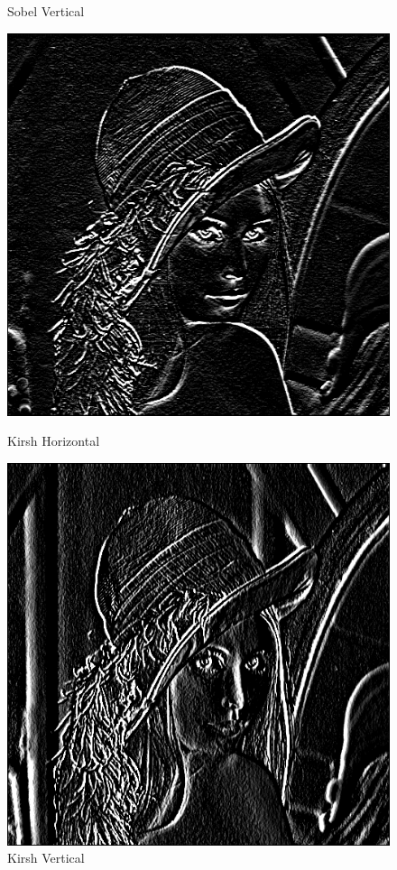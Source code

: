 \documentclass[11pt]{article}
\begin{document}
\begin{figure}[H]
\begin{minipage}[c]{.46\linewidth}
			\caption{Sobel Vertical}
			\label{fig:SobelVertical}
		\end{minipage}
		\begin{minipage}[c]{.46\linewidth}
			\centering
			\includegraphics[scale=0.25]{Image/filtreKirshHorizontal.png}
			\caption{Kirsh Horizontal}
			\label{fig:KirshHorizontal}
		\end{minipage} \hfill
		\begin{minipage}[c]{.46\linewidth}
		\centering
			\includegraphics[scale=0.25]{Image/filtreKirshVertical.png}
			\caption{Kirsh Vertical}
			\label{fig:KirshVertical}
		\end{minipage}
	\end{figure}
\end{document}
